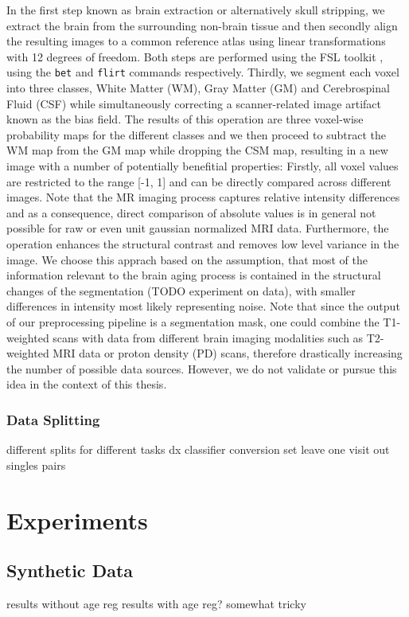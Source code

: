 In the first step known as brain extraction or alternatively skull stripping, we extract the brain from the surrounding non-brain tissue and then secondly align the resulting images to a common reference atlas using linear transformations with 12 degrees of freedom. Both steps are performed using the FSL toolkit \cite{FSL}, using the \texttt{bet} and \texttt{flirt} commands respectively. Thirdly, we segment each voxel into three classes, White Matter (WM), Gray Matter (GM) and Cerebrospinal Fluid (CSF) while simultaneously correcting a scanner-related image artifact known as the bias field. The results of this operation are three voxel-wise probability maps for the different classes and we then proceed to subtract the WM map from the GM map while dropping the CSM map, resulting in a new image with a number of potentially benefitial properties: Firstly, all voxel values are restricted to the range [-1, 1] and can be directly compared across different images. Note that the MR imaging process captures relative intensity differences and as a consequence, direct comparison of absolute values is in general not possible for raw or even unit gaussian normalized MRI data. Furthermore, the operation enhances the structural contrast and removes low level variance in the image. We choose this apprach based on the assumption, that most of the information relevant to the brain aging process is contained in the structural changes of the segmentation (TODO experiment on data), with smaller differences in intensity most likely representing noise.
Note that since the output of our preprocessing pipeline is a segmentation mask, one could combine the T1-weighted scans with data from different brain imaging modalities such as T2-weighted MRI data or proton density (PD) scans, therefore drastically increasing the number of possible data sources. However, we do not validate or pursue this idea in the context of this thesis.

\subsection{Data Splitting}

different splits for different tasks
dx classifier
conversion set
leave one visit out
singles
pairs

\chapter{Experiments}

\section{Synthetic Data}
results without age reg
results with age reg? somewhat tricky


